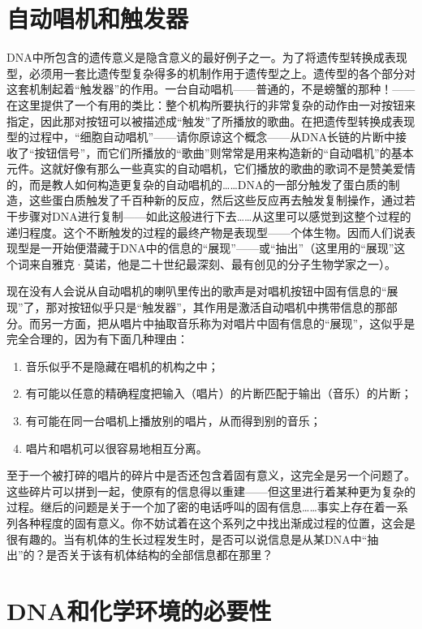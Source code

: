 \section{自动唱机和触发器}

DNA中所包含的遗传意义是隐含意义的最好例子之一。为了将遗传型转换成表现型，必须用一套比遗传型复杂得多的机制作用于遗传型之上。遗传型的各个部分对这套机制起着“触发器”的作用。一台自动唱机——普通的，不是螃蟹的那种！——在这里提供了一个有用的类比：整个机构所要执行的非常复杂的动作由一对按钮来指定，因此那对按钮可以被描述成“触发”了所播放的歌曲。在把遗传型转换成表现型的过程中，“细胞自动唱机”——请你原谅这个概念——从DNA长链的片断中接收了“按钮信号”，而它们所播放的“歌曲”则常常是用来构造新的“自动唱机”的基本元件。这就好像有那么一些真实的自动唱机，它们播放的歌曲的歌词不是赞美爱情的，而是教人如何构造更复杂的自动唱机的……DNA的一部分触发了蛋白质的制造，这些蛋白质触发了千百种新的反应，然后这些反应再去触发复制操作，通过若干步骤对DNA进行复制——如此这般进行下去……从这里可以感觉到这整个过程的递归程度。这个不断触发的过程的最终产物是表现型——个体生物。因而人们说表现型是一开始便潜藏于DNA中的信息的“展现”——或“抽出”（这里用的“展现”这个词来自雅克·莫诺，他是二十世纪最深刻、最有创见的分子生物学家之一）。

现在没有人会说从自动唱机的喇叭里传出的歌声是对唱机按钮中固有信息的“展现”了，那对按钮似乎只是“触发器”，其作用是激活自动唱机中携带信息的那部分。而另一方面，把从唱片中抽取音乐称为对唱片中固有信息的“展现”，这似乎是完全合理的，因为有下面几种理由：
\begin{enumerate}
\item 音乐似乎不是隐藏在唱机的机构之中；
\item 有可能以任意的精确程度把输入（唱片）的片断匹配于输出（音乐）的片断；
\item 有可能在同一台唱机上播放别的唱片，从而得到别的音乐；
\item 唱片和唱机可以很容易地相互分离。
\end{enumerate}

至于一个被打碎的唱片的碎片中是否还包含着固有意义，这完全是另一个问题了。这些碎片可以拼到一起，使原有的信息得以重建——但这里进行着某种更为复杂的过程。继后的问题是关于一个加了密的电话呼叫的固有信息……事实上存在着一系列各种程度的固有意义。你不妨试着在这个系列之中找出渐成过程的位置，这会是很有趣的。当有机体的生长过程发生时，是否可以说信息是从某DNA中“抽出”的？是否关于该有机体结构的全部信息都在那里？

\section{DNA和化学环境的必要性}

